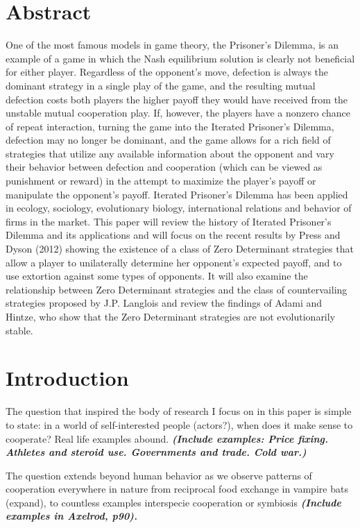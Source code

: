 
\chapter{Abstract}
One of the most famous models in game theory, the Prisoner's Dilemma, is an example of a game in which the Nash equilibrium solution is clearly not beneficial for either player. Regardless of the opponent's move, defection is always the dominant strategy in a single play of the game, and the resulting mutual defection costs both players the higher payoff they would have received from the unstable mutual cooperation play. If, however, the players have a nonzero chance of repeat interaction, turning the game into the Iterated Prisoner's Dilemma, defection may no longer be dominant, and the game allows for a rich field of strategies that utilize any available information about the opponent and vary their behavior between defection and cooperation (which can be viewed as punishment or reward) in the attempt to maximize the player's payoff or manipulate the opponent's payoff. Iterated Prisoner's Dilemma has been applied in ecology, sociology, evolutionary biology, international relations and behavior of firms in the market. This paper will review the history of Iterated Prisoner's Dilemma and its applications and will focus on the recent results by Press and Dyson (2012) showing the existence of a class of Zero Determinant strategies that allow a player to unilaterally determine her opponent's expected payoff, and to use extortion against some types of opponents. It will also examine the relationship between Zero Determinant strategies and the class of countervailing strategies proposed by J.P. Langlois and review the findings of Adami and Hintze, who show that the Zero Determinant strategies are not evolutionarily stable.

\chapter{Introduction}

The question that inspired the body of research I focus on in this paper is simple to state: in a world of self-interested people (actors?), when does it make sense to cooperate?  Real life examples abound. \textit{\textbf{(Include examples: Price fixing. Athletes and steroid use. Governments and trade. Cold war.)}}

The question extends beyond human behavior as we observe patterns of cooperation everywhere in nature from reciprocal food exchange in vampire bats (expand), to countless examples interspecie cooperation or symbiosis \textit{\textbf{(Include examples in Axelrod, p90).}}


